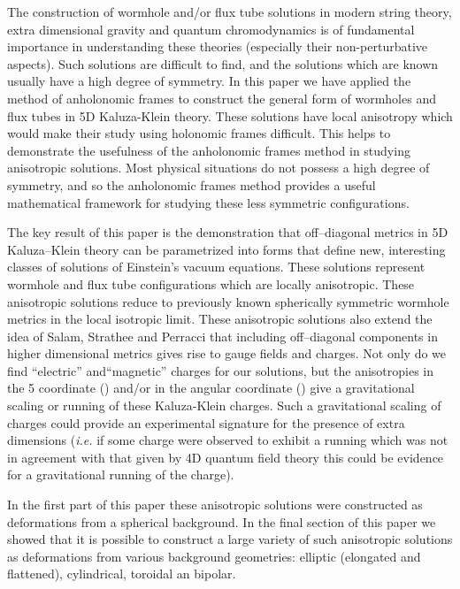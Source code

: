 \documentclass[a4paper,preprint,prabib,aps]{revtex4}
\begin{document}
The construction of wormhole and/or flux tube solutions in modern string
theory, extra dimensional gravity and quantum chromodynamics is of
fundamental importance in understanding these theories (especially their
non-perturbative aspects). Such solutions are difficult to find, and the
solutions which are known usually have a high degree of symmetry. In this
paper we have applied the method of anholonomic frames to construct the
general form of wormholes and flux tubes in 5D Kaluza-Klein theory. These
solutions have local anisotropy which would make their study using holonomic
frames difficult. This helps to demonstrate the usefulness of the
anholonomic frames method in studying anisotropic solutions. Most physical
situations do not possess a high degree of symmetry, and so the anholonomic
frames method provides a useful mathematical framework for studying these
less symmetric configurations.

The key result of this paper is the demonstration that off--diagonal metrics
in 5D Kaluza--Klein theory can be parametrized into forms that define new,
interesting classes of solutions of Einstein's vacuum equations. These
solutions represent wormhole and flux tube configurations which are locally
anisotropic. These anisotropic solutions reduce to previously known
spherically symmetric wormhole metrics \cite{chodos,dzhsin,ds} in the local
isotropic limit. These anisotropic solutions also extend the idea of Salam,
Strathee and Perracci \cite{sal} that including off--diagonal components in
higher dimensional metrics gives rise to gauge fields and charges. Not only
do we find ``electric'' and``magnetic'' charges for our solutions, but the
anisotropies in the 5\coordHE{} coordinate (\myHighlight{$\chi$}\coordHE{}) and/or in the angular
coordinate (\myHighlight{$\varphi$}\coordHE{}) give a gravitational scaling or running of these
Kaluza-Klein charges. Such a gravitational scaling of charges could provide
an experimental signature for the presence of extra dimensions ({\it i.e.}
if some charge were observed to exhibit a running which was not in agreement
with that given by 4D quantum field theory this could be evidence for a
gravitational running of the charge).

In the first part of this paper these anisotropic solutions were constructed
as deformations from a spherical background. In the final section of this
paper we showed that it is possible to construct a large variety of such
anisotropic solutions as deformations from various background geometries:
elliptic (elongated and flattened), cylindrical, toroidal an bipolar.
\end{document}
